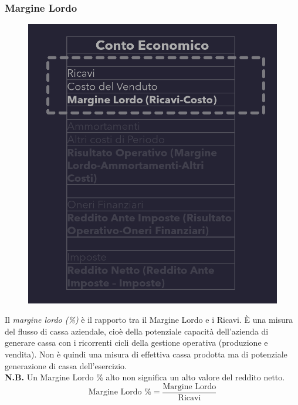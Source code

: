 \documentclass{article}
\begin{document}
\subsubsection{Margine Lordo}
\begin{figure}
    \includegraphics[scale=0.3]{Image/MargineLordo_1.png}
\end{figure}
Il \textit{margine lordo (\%)} è il rapporto tra il Margine Lordo e i Ricavi. È una misura del flusso di cassa aziendale, cioè della potenziale capacità dell'azienda di generare cassa con i ricorrenti cicli della gestione operativa (produzione e vendita). Non è quindi una misura di effettiva cassa prodotta ma di potenziale generazione di cassa dell'esercizio.\\
\textbf{N.B.} Un Margine Lordo \% alto non significa un alto valore del reddito netto.
\[
    \text{Margine Lordo \%} = \frac{\text{Margine Lordo}}{\text{Ricavi}}
\]
\end{document}
